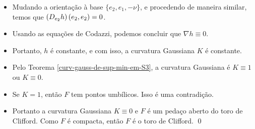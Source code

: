 \documentclass[12pt,a4paper]{beamer}
\theoremstyle{definition}
\begin{document}
\begin{frame}

	\begin{itemize}	
		
		\item Mudando a orientação à base $\{ e_2, e_1, -\nu \}$, e procedendo de maneira similar, temos que $\left( D_{e_2}h \right) \left( e_2,e_2 \right)=0$.
		
		\pause
		
		\item Usando as equações de Codazzi, podemos concluir que $\nabla h \equiv 0$.
		
		\pause
		
		\item Portanto, $h$ é constante, e com isso, a curvatura Gaussiana $K$ é constante.

		\pause

		\item Pelo Teorema \ref{curv-gauss-de-sup-min-em-S3}, a curvatura Gaussiana é $K \equiv 1$ ou $K \equiv 0$.
		
		\pause
		
		\item Se $K=1$, então $F$ tem pontos umbílicos. 
		Isso é uma contradição.
		
		\pause
		
		\item Portanto a curvatura Gaussiana $K \equiv 0$ e $F$ é um pedaço aberto do toro de Clifford.
		Como $F$ é compacta, então $F$ é o toro de Clifford.
		\qed
	\end{itemize}

\end{frame}
\end{document}
